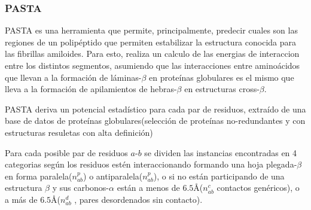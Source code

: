 % 








\subsubsection{PASTA}\label{pasta}


PASTA\cite{trovato2006insight} es una herramienta que permite, principalmente, predecir cuales son las regiones de un polipéptido que permiten estabilizar la estructura conocida para las fibrillas amiloides.
Para esto, realiza un calculo de las energias de interaccion entre los distintos segmentos, asumiendo que las interacciones entre aminoácidos que llevan a la formación 
de láminas-$\beta$ en proteínas globulares es el mismo que lleva a la formación de apilamientos de hebras-$\beta$ en estructuras cross-$\beta$.

PASTA deriva un potencial estadístico para cada par de residuos, extraído de una base de datos de proteínas globulares(selección de proteínas no-redundantes y con estructuras resuletas con alta definición)

Para cada posible par de residuos $a$-$b$ se dividen las instancias encontradas en 4 categorias según los residuos estén interaccionando formando una hoja plegada-$\beta$ en forma paralela($n_{ab}^p$) o antiparalela($n_{ab}^p$), 
o si no están participando de una estructura $\beta$ y sus carbonos-$\alpha$ están a menos de $6.5$\AA ($n_{ab}^c$ contactos genéricos), o a más de $6.5$\AA ($n_{ab}^d$ , pares desordenados sin contacto). 

